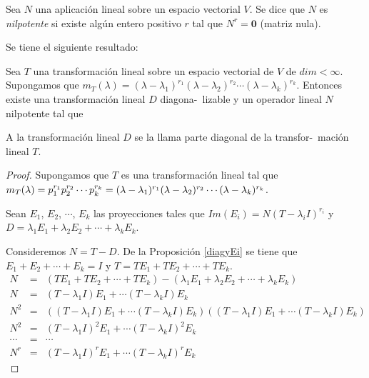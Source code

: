 \bigskip

\begin{definition}\label{nilpo}

Sea $N$ una aplicación lineal sobre un espacio vectorial $V$. Se dice que $N$ es \textit{nilpotente}  si existe algún entero positivo $r$ tal que $N^r= \textbf{0}$  (matriz nula).

\end{definition}


\bigskip

Se tiene el siguiente resultado:

\bigskip

\begin{corollary}
    


Sea $T$ una transformación lineal sobre un espacio vectorial de $V$ de $dim<\infty$. Supongamos que $m_T(\lambda)=(\lambda-\lambda_1)^{r_1} (\lambda-\lambda_2)^{r_2}\cdots(\lambda-\lambda_k)^{r_k}$. Entonces existe una transformación lineal  $D$ diagona-\ lizable y  un operador lineal  $N$ nilpotente tal que 


\bigskip
A la transformación lineal $D$ se la llama parte diagonal de la transfor-\ mación lineal $T$.
\begin{proof}
Supongamos que $T$  es una transformación lineal tal que  $m_T(\lambda)=p_1^{r_1}p_2^{r_2}   \cdots p_k^{r_k}= \\(\lambda-\lambda_1)^{r_1} (\lambda-\lambda_2)^{r_2}\cdots(\lambda-\lambda_k)^{r_k}$. 

Sean $E_1$, $E_2$, $\cdots$, $E_k$ las proyecciones tales que $Im(E_i)=N(T- \lambda_i I)^{r_i}$ y 
$D=\lambda_1 E_1 + \lambda_2 E_2  + \cdots +  \lambda_k E_k$.

\bigskip

Consideremos $N=T-D$.
De la Proposición \ref{diagyEi} se tiene que $E_1+E_2+ \cdots+E_k=I$ y $T=TE_1+TE_2+ \cdots + TE_k$.
\begin{eqnarray*}
    N&=&(T E_1+T E_2 +\cdots +T E_k)- (\lambda_1 E_1 + \lambda_2 E_2  + \cdots +  \lambda_k E_k) \\
     N&=&  (T-\lambda_1 I) E_1 + \cdots  (T-\lambda_k I) E_k \\
N^2&=& ((T-\lambda_1 I) E_1 + \cdots  (T-\lambda_k I) E_k )((T-\lambda_1 I) E_1 + \cdots  (T-\lambda_k I) E_k ) \\
N^2&=& (T-\lambda_1 I)^2 E_1 + \cdots  (T-\lambda_k I)^2 E_k \\
\cdots &=& \cdots \\
N^r&=& (T-\lambda_1 I)^r E_1 + \cdots  (T-\lambda_k I)^r E_k 
\end{eqnarray*}


\end{proof}
\end{corollary}
